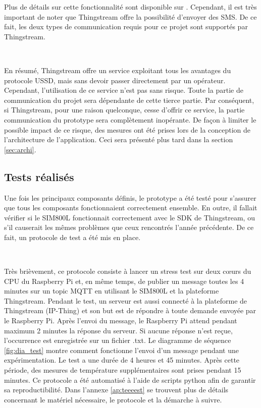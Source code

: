 \noindent
Plus de détails sur cette fonctionnalité sont disponible sur \cite{thing_dataflow}. Cependant, il est très important de noter que Thingstream offre la possibilité d’envoyer des SMS. De ce fait, les deux types de communication requis pour ce projet sont supportés par Thingstream.

~

\noindent
En résumé, Thingstream offre un service exploitant tous les avantages du protocole USSD, mais sans devoir passer directement par un opérateur. Cependant, l’utilisation de ce service n’est pas sans risque. Toute la partie de communication du projet sera dépendante de cette tierce partie. Par conséquent, si Thingstream, pour une raison quelconque, cesse d'offrir ce service, la partie communication du prototype sera complètement inopérante. De façon à limiter le possible impact de ce risque, des mesures ont été prises lors de la conception de l’architecture de l’application. Ceci sera présenté plus tard dans la section \ref{sec:archi}.

\subsection{Tests réalisés}
\label{sec:prototests}


Une fois les principaux composants définis, le prototype a été testé pour s’assurer que tous les composants fonctionnaient correctement ensemble. En outre, il fallait vérifier si le SIM800L fonctionnait correctement avec le SDK de Thingstream, ou s’il causerait les mêmes problèmes que ceux rencontrés l’année précédente. De ce fait, un protocole de test a été mis en place.

~

\noindent
Très brièvement, ce protocole consiste à lancer un stress test sur deux cœurs du CPU du Raspberry Pi et, en même temps, de publier un message toutes les 4 minutes sur un topic MQTT en utilisant le SIM800L et la plateforme Thingstream. Pendant le test, un serveur est aussi connecté à la plateforme de Thingstream (IP-Thing) et son but est de répondre à toute demande envoyée par le Raspberry Pi. Après l’envoi du message, le Raspberry Pi attend pendant maximum 2 minutes la réponse du serveur. Si aucune réponse n’est reçue, l’occurrence est enregistrée sur un fichier .txt. Le diagramme de séquence \ref{fig:dia_test} montre comment fonctionne l’envoi d’un message pendant une expérimentation. Le test a une durée de 4 heures et 45 minutes. Après cette période, des mesures de température supplémentaires sont prises pendant 15 minutes. Ce protocole a été automatisé à l'aide de scripts python afin de garantir sa reproductibilité. Dans l’annexe \ref{ap:teeeest} se trouvent plus de détails concernant le matériel nécessaire, le protocole et la démarche à suivre.

